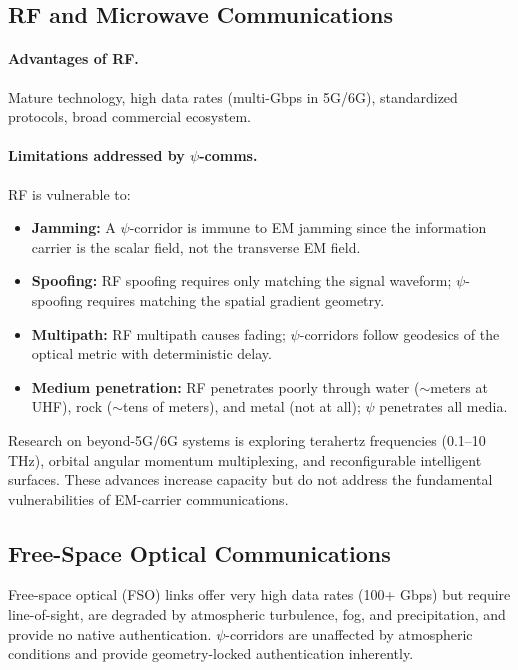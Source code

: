 \documentclass[twocolumn,superscriptaddress,prd,nofootinbib]{revtex4-2}
\begin{document}
\subsection{RF and Microwave Communications}

\paragraph{Advantages of RF.}
Mature technology, high data rates (multi-Gbps in 5G/6G), standardized
protocols, broad commercial ecosystem.

\paragraph{Limitations addressed by $\psi$-comms.}
RF is vulnerable to:
\begin{itemize}
\item \textbf{Jamming:} A $\psi$-corridor is immune to EM jamming since
the information carrier is the scalar field, not the transverse EM field.
\item \textbf{Spoofing:} RF spoofing requires only matching the signal
waveform; $\psi$-spoofing requires matching the spatial gradient geometry.
\item \textbf{Multipath:} RF multipath causes fading; $\psi$-corridors
follow geodesics of the optical metric with deterministic delay.
\item \textbf{Medium penetration:} RF penetrates poorly through water
($\sim$meters at UHF), rock ($\sim$tens of meters), and metal (not at
all); $\psi$ penetrates all media.
\end{itemize}

Research on beyond-5G/6G systems is exploring terahertz frequencies
(0.1--10 THz), orbital angular momentum multiplexing, and reconfigurable
intelligent surfaces.
These advances increase capacity but do not address the fundamental
vulnerabilities of EM-carrier communications.

\subsection{Free-Space Optical Communications}

Free-space optical (FSO) links offer very high data rates (100+ Gbps)
but require line-of-sight, are degraded by atmospheric turbulence, fog,
and precipitation, and provide no native authentication.
$\psi$-corridors are unaffected by atmospheric conditions and provide
geometry-locked authentication inherently.
\end{document}
